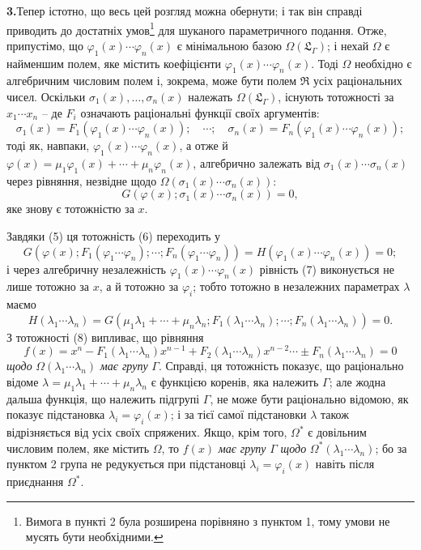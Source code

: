 \documentclass[11pt]{article}
\begin{document}
\noindent\textbf{3.}\quad Тепер істотно, що весь цей розгляд можна обернути; і так він справді приводить до достатніх умов\footnote{Вимога в пункті 2 була розширена порівняно з пунктом 1, тому умови не мусять бути необхідними.} для шуканого параметричного подання. Отже, припустімо, що $\varphi_1(x)\cdots\varphi_n(x)$ є мінімальною базою $\Omega(\mathfrak L_\Gamma)$; і нехай $\Omega$ є найменшим полем, яке містить коефіцієнти $\varphi_1(x)\cdots\varphi_n(x)$. Тоді $\Omega$ необхідно є алгебричним числовим полем і, зокрема, може бути полем $\mathfrak R$ усіх раціональних чисел. Оскільки $\sigma_1(x),\ldots,\sigma_n(x)$ належать $\Omega(\mathfrak L_\Gamma)$, існують тотожності за $x_1\cdots x_n$ -- де $F_i$ означають раціональні функції своїх аргументів:
\begin{equation}
\sigma_1(x)=F_1(\varphi_1(x)\cdots\varphi_n(x));\quad \cdots;\quad
\sigma_n(x)=F_n(\varphi_1(x)\cdots\varphi_n(x));
\tag{5}
\end{equation}
тоді як, навпаки, $\varphi_1(x)\cdots\varphi_n(x)$, а отже й $\varphi(x)=\mu_1\varphi_1(x)+\cdots+\mu_n\varphi_n(x)$, алгебрично залежать від $\sigma_1(x)\cdots\sigma_n(x)$ через рівняння, незвідне щодо $\Omega(\sigma_1(x)\cdots\sigma_n(x))$:
\begin{equation}
G(\varphi(x);\sigma_1(x)\cdots\sigma_n(x))=0,
\tag{6}
\end{equation}
яке знову є тотожністю за $x$.

Завдяки (5) ця тотожність (6) переходить у
\begin{equation}
G(\varphi(x);F_1(\varphi_1\cdots\varphi_n);\cdots;F_n(\varphi_1\cdots\varphi_n))
=H(\varphi_1(x)\cdots\varphi_n(x))=0;
\tag{7}
\end{equation}
і через алгебричну незалежність $\varphi_1(x)\cdots\varphi_n(x)$ рівність (7) виконується не лише тотожно за $x$, а й тотожно за $\varphi_i$; тобто тотожно в незалежних параметрах $\lambda$ маємо
\begin{equation}
H(\lambda_1\cdots\lambda_n)=G(\mu_1\lambda_1+\cdots+\mu_n\lambda_n;F_1(\lambda_1\cdots\lambda_n);\cdots;F_n(\lambda_1\cdots\lambda_n))=0.
\tag{8}
\end{equation}
З тотожності (8) випливає, що рівняння
\begin{equation}
f(x)=x^n-F_1(\lambda_1\cdots\lambda_n)x^{n-1}+F_2(\lambda_1\cdots\lambda_n)x^{n-2}\cdots\pm F_n(\lambda_1\cdots\lambda_n)=0
\tag{9}
\end{equation}
\emph{щодо} $\Omega(\lambda_1\cdots\lambda_n)$ \emph{має групу} $\Gamma$. Справді, ця тотожність показує, що раціонально відоме $\lambda=\mu_1\lambda_1+\cdots+\mu_n\lambda_n$ є функцією коренів, яка належить $\Gamma$; але жодна дальша функція, що належить підгрупі $\Gamma$, не може бути раціонально відомою, як показує підстановка $\lambda_i=\varphi_i(x)$; і за тієї самої підстановки $\lambda$ також відрізняється від усіх своїх спряжених. Якщо, крім того, $\Omega^*$ є довільним числовим полем, яке містить $\Omega$, то $f(x)$ \emph{має групу} $\Gamma$ \emph{щодо} $\Omega^*(\lambda_1\cdots\lambda_n)$; бо за пунктом 2 група не редукується при підстановці $\lambda_i=\varphi_i(x)$ навіть після приєднання $\Omega^*$.
\end{document}
